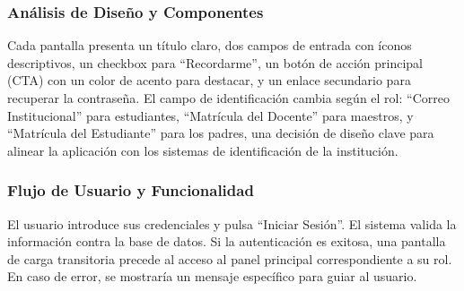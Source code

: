 \begin{samepage}
	\subsubsection*{Análisis de Diseño y Componentes}
	Cada pantalla presenta un título claro, dos campos de entrada con íconos descriptivos, un checkbox para ``Recordarme'', un botón de acción principal (CTA) con un color de acento para destacar, y un enlace secundario para recuperar la contraseña. El campo de identificación cambia según el rol: ``Correo Institucional'' para estudiantes, ``Matrícula del Docente'' para maestros, y ``Matrícula del Estudiante'' para los padres, una decisión de diseño clave para alinear la aplicación con los sistemas de identificación de la institución.
    
	\subsubsection*{Flujo de Usuario y Funcionalidad}
	El usuario introduce sus credenciales y pulsa ``Iniciar Sesión''. El sistema valida la información contra la base de datos. Si la autenticación es exitosa, una pantalla de carga transitoria precede al acceso al panel principal correspondiente a su rol. En caso de error, se mostraría un mensaje específico para guiar al usuario.
\normalsize\end{samepage}
\clearpage

